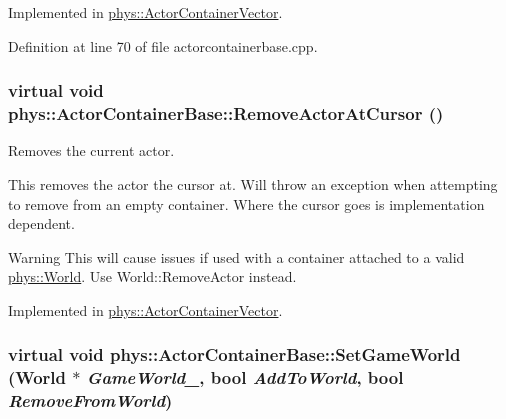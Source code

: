Implemented in \hyperlink{classphys_1_1ActorContainerVector_aeee5bd81601faed85e6a35f576c8d476}{phys::ActorContainerVector}.



Definition at line 70 of file actorcontainerbase.cpp.

\hypertarget{classphys_1_1ActorContainerBase_a60f37a056e8750f3b389c5ceed14520c}{
\subsubsection[{RemoveActorAtCursor}]{\setlength{\rightskip}{0pt plus 5cm}virtual void phys::ActorContainerBase::RemoveActorAtCursor ()}}
\label{d1/d00/classphys_1_1ActorContainerBase_a60f37a056e8750f3b389c5ceed14520c}


Removes the current actor. 

This removes the actor the cursor at. Will throw an exception when attempting to remove from an empty container. Where the cursor goes is implementation dependent. \begin{DoxyWarning}{Warning}
This will cause issues if used with a container attached to a valid \hyperlink{classphys_1_1World}{phys::World}. Use World::RemoveActor instead. 
\end{DoxyWarning}


Implemented in \hyperlink{classphys_1_1ActorContainerVector_a430977daf010a25f53df6cf37954f8ca}{phys::ActorContainerVector}.

\hypertarget{classphys_1_1ActorContainerBase_a366c1797bef08f3a1846bf010e2e2b04}{
\subsubsection[{SetGameWorld}]{\setlength{\rightskip}{0pt plus 5cm}virtual void phys::ActorContainerBase::SetGameWorld ({\bf World} $\ast$ {\em GameWorld\_\-}, \/  bool {\em AddToWorld}, \/  bool {\em RemoveFromWorld})}}
\label{d1/d00/classphys_1_1ActorContainerBase_a366c1797bef08f3a1846bf010e2e2b04}


